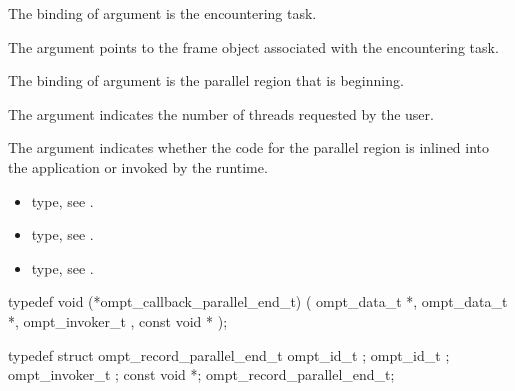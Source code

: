 \argdesc

The binding of argument  is the
encountering task.

The argument  points to the frame object
associated with the encountering task.

The binding of argument  is the parallel
region that is beginning.

The argument 
indicates the number of threads requested by the user. 

The argument  indicates whether the code for the
parallel region is inlined into the application or invoked by the
runtime.

\codeptrdesc

\crossreferences
\begin{itemize}
\item {} type, see .
\item {} type, see .
\item {} type, see .
\end{itemize}



\label{sec:ompt_callback_parallel_end_t}
\format

\begin{ccppspecific}
\begin{omptCallback}
typedef void (*ompt_callback_parallel_end_t) (
  ompt_data_t *,
  ompt_data_t *,
  ompt_invoker_t ,
  const void *
);
\end{omptCallback}
\end{ccppspecific}


\record

\begin{ccppspecific}
\begin{omptRecord}
typedef struct ompt_record_parallel_end_t {
  ompt_id_t ;
  ompt_id_t ;
  ompt_invoker_t ;
  const void *;
} ompt_record_parallel_end_t;
\end{omptRecord}
\end{ccppspecific}


\argdesc

